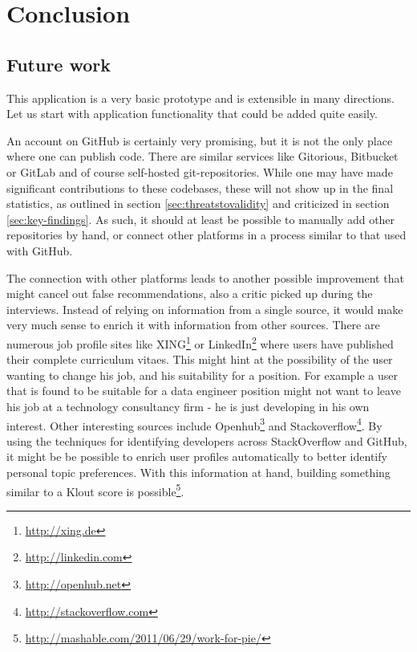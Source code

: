 \chapter{Conclusion}\label{ch:conclusion}
\section{Future work}\label{sec:future-work}
This application is a very basic prototype and is extensible in many directions.
Let us start with application functionality that could be added quite easily.

An account on GitHub is certainly very promising, but it is not the only
place where one can publish code. There are similar services like Gitorious,
Bitbucket or GitLab and of course self-hosted git-repositories.
While one may have made significant contributions to these codebases,
these will not show up in the final statistics, as outlined in
section \ref{sec:threatstovalidity} and criticized in section \ref{sec:key-findings}.
As such, it should at least be possible to manually add other repositories by
hand, or connect other platforms in a process similar to that used with GitHub.

The connection with other platforms leads to another possible improvement
that might cancel out false recommendations, also a critic picked up during the
interviews.
Instead of relying on information from a single source, it would make very
much sense to enrich it with information from other sources. There
are numerous job profile sites like XING\footnote{\url{http://xing.de}}
or LinkedIn\footnote{\url{http://linkedin.com}} where users have
published their complete curriculum vitaes. This might hint at the
possibility of the user wanting to change his job, and his suitability for
a position. For example a user that is found to be suitable for a data engineer
position might not want to leave his job at a technology consultancy
firm - he is just developing in his own interest.
Other interesting sources include Openhub\footnote{\url{http://openhub.net}}
and Stackoverflow\footnote{\url{http://stackoverflow.com}}.
By using the techniques for identifying developers across StackOverflow and
GitHub\cite{vfs:2013}, it might be be possible to enrich user profiles
automatically to better identify personal topic preferences.
With this information at hand, building something similar to a Klout score
is possible\footnote{\url{http://mashable.com/2011/06/29/work-for-pie/}}.
\newline

